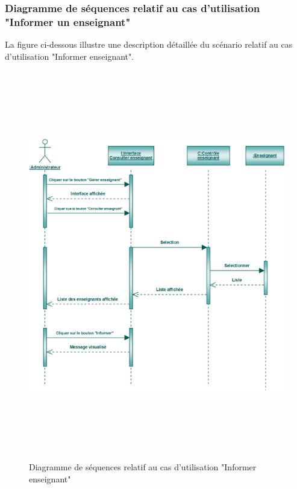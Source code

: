 \documentclass[12 pt ]{report}
\begin{document}
\subsubsection{Diagramme de séquences relatif au cas d’utilisation "Informer un enseignant" }
La figure ci-dessous illustre une description détaillée du scénario relatif au cas d'utilisation "Informer  enseignant". 
\begin{figure}[h]
 \begin{center}
\includegraphics[width= 14 cm ,height= 17cm]{sec_info_ens.PNG}
\caption {Diagramme de séquences relatif au cas d'utilisation "Informer  enseignant"}
\end{center}
\end{figure}
\newpage
\end{document}
